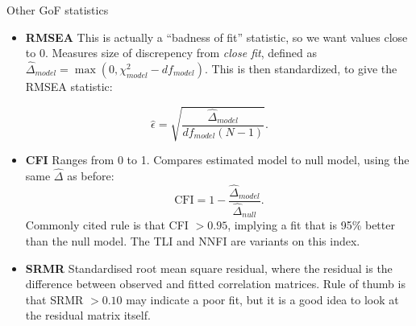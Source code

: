 \documentclass[10pt,ignorenonframetext,]{beamer}
\providecommand{\tightlist}{%
\setlength{\itemsep}{0pt}\setlength{\parskip}{0pt}}
\begin{document}
\begin{frame}{Other GoF statistics}

\small

\begin{itemize}
\tightlist
\item
  \textbf{RMSEA} This is actually a ``badness of fit'' statistic, so we
  want values close to 0. Measures size of discrepency from \emph{close
  fit}, defined as
  \(\hat{\Delta}_{model} = \max(0, \chi^2_{model} - df_{model})\). This
  is then standardized, to give the RMSEA statistic:
\end{itemize}

\[
\hat{\epsilon} = \sqrt{\frac{\hat{\Delta}_{model}} {df_{model}(N - 1)}}.
\]

\begin{itemize}
\item
  \textbf{CFI} Ranges from 0 to 1. Compares estimated model to null
  model, using the same \(\hat{\Delta}\) as before: \[
  \mathrm{CFI} = 1 - \frac{\hat{\Delta}_{model}}{\hat{\Delta}_{null}}.
  \] Commonly cited rule is that CFI \(> 0.95\), implying a fit that is
  95\% better than the null model. The TLI and NNFI are variants on this
  index.
\item
  \textbf{SRMR} Standardised root mean square residual, where the
  residual is the difference between observed and fitted correlation
  matrices. Rule of thumb is that SRMR \(> 0.10\) may indicate a poor
  fit, but it is a good idea to look at the residual matrix itself.
\end{itemize}

\end{frame}
\end{document}
